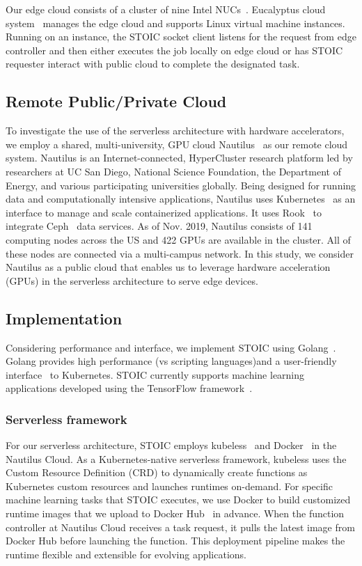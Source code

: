 Our edge cloud consists of a cluster of nine Intel NUCs~\cite{ref:nucs}.
Eucalyptus cloud system~\cite{ref:euca} manages the edge cloud and supports Linux virtual machine instances. Running on an instance, the STOIC socket client listens for the request from edge controller and then either executes the job locally on edge cloud or has STOIC requester interact with public cloud to complete the designated task.
 
 \subsection{Remote Public/Private Cloud}

To investigate the use of the serverless architecture with hardware accelerators, we employ a shared, multi-university, GPU cloud Nautilus~\cite{ref:nautilus} as our remote cloud system. Nautilus is an Internet-connected, HyperCluster research platform led by researchers at UC San Diego, National Science Foundation, the Department of Energy, and various participating universities globally.  Being designed for running data and computationally intensive applications, Nautilus uses Kubernetes~\cite{ref:k8s} as an interface to manage and scale containerized applications.  It uses Rook~\cite{ref:rook} to integrate Ceph~\cite{ref:ceph} data services. As of Nov. 2019, Nautilus consists of 141 computing nodes across the US and 422 GPUs are available in the cluster. All of these nodes are connected via a multi-campus network. In this study, we consider Nautilus as a public cloud that enables us to leverage hardware acceleration (GPUs) in the serverless architecture to serve edge devices. 
 
 \subsection{Implementation}
 
 Considering performance and interface, we
implement STOIC using Golang~\cite{ref:golang}. Golang provides high 
performance (vs scripting languages)and a user-friendly 
interface~\cite{ref:client-go} to Kubernetes.  STOIC currently supports
machine learning applications developed using the TensorFlow 
framework~\cite{ref:tensorflow}.
 
 \BlankLine
 \subsubsection{Serverless framework}
 For our serverless architecture, STOIC employs 
kubeless~\cite{ref:kubeless} and Docker~\cite{ref:docker} in the
 Nautilus Cloud. As a Kubernetes-native serverless framework, 
kubeless uses the Custom Resource Definition (CRD)\cite{ref:crd} to dynamically create functions as Kubernetes custom resources and launches runtimes on-demand. For specific machine learning tasks that STOIC executes, we use Docker to build customized runtime images that we upload to Docker 
Hub~\cite{ref:dockerhub} in advance. When the function controller 
at Nautilus Cloud receives a task request, it pulls the latest image 
from Docker Hub before launching the function. This deployment pipeline 
makes the runtime flexible and extensible for evolving applications. 
 
